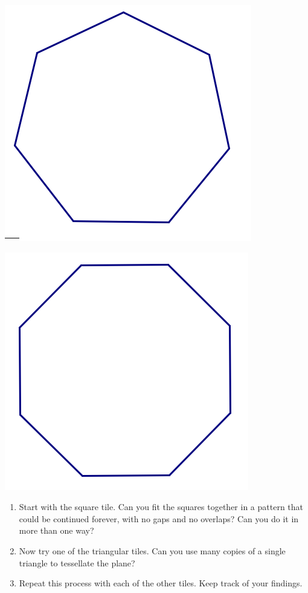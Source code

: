 \documentclass[12pt, reqno]{amsart}
\theoremstyle{remark}
\theoremstyle{definition}
\numberwithin{equation}{section}  %
\begin{document}
\begin{center}
\includegraphics[scale=0.75]{heptagon}


\includegraphics[scale=0.7]{octagon}


\end{center}

\begin{enumerate}
\item
Start with the square tile.  Can you fit the squares together in a pattern that could be continued forever, with no gaps and no overlaps?  Can you do it in more than one way?\\

\item
Now try one of the triangular tiles.  Can you use many copies of a single triangle to tessellate the plane?\\

\item
Repeat this process with each of the other tiles.  Keep track of your findings.\\
\end{enumerate}
\end{document}
